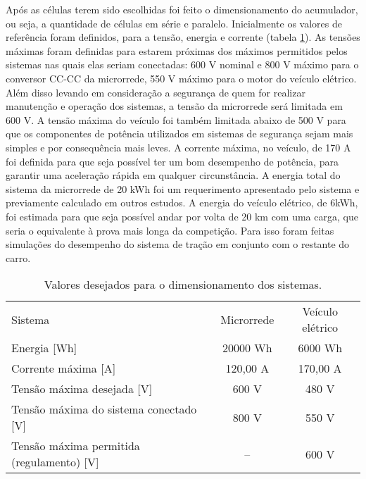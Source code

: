     Após as células terem sido escolhidas foi feito o dimensionamento do acumulador, ou seja, a quantidade de células em série e paralelo. Inicialmente os valores de referência foram definidos, para a tensão, energia e corrente (tabela \ref{tab:acc-desejado}). As tensões máximas foram definidas para estarem próximas dos máximos permitidos pelos sistemas nas quais elas seriam conectadas: 600 V nominal e 800 V máximo para o conversor CC-CC da microrrede, 550 V máximo para o motor do veículo elétrico. Além disso levando em consideração a segurança de quem for realizar manutenção e operação dos sistemas, a tensão da microrrede será limitada em 600 V. A tensão máxima do veículo foi também limitada abaixo de 500 V para que os componentes de potência utilizados em sistemas de segurança sejam mais simples e por consequência mais leves. A corrente máxima, no veículo, de 170 A foi definida para que seja possível ter um bom desempenho de potência, para garantir uma aceleração rápida em qualquer circunstância. A energia total do sistema da microrrede de 20 kWh foi um requerimento apresentado pelo sistema e previamente calculado em outros estudos. A energia do veículo elétrico, de 6kWh, foi estimada para que seja possível andar por volta de 20 km com uma carga, que seria o equivalente à prova mais longa da competição. Para isso foram feitas simulações do desempenho do sistema de tração em conjunto com o restante do carro.

    \begin{table}[!htp]
        \centering
        \caption{Valores desejados para o dimensionamento dos sistemas.}
        \label{tab:acc-desejado}
        \begin{tabular}{lcc}
            \hline
            Sistema                                      & Microrrede    & Veículo elétrico  \\
            Energia [Wh]                                 & 20000 Wh      & 6000 Wh           \\
            Corrente máxima [A]                          & 120,00 A      & 170,00 A          \\
            Tensão máxima desejada [V]                   & 600 V         & 480 V             \\
            Tensão máxima do sistema conectado [V]       & 800 V         & 550 V             \\
            Tensão máxima permitida (regulamento) [V]    & --            & 600 V             \\
            \hline
        \end{tabular}
    \end{table}

